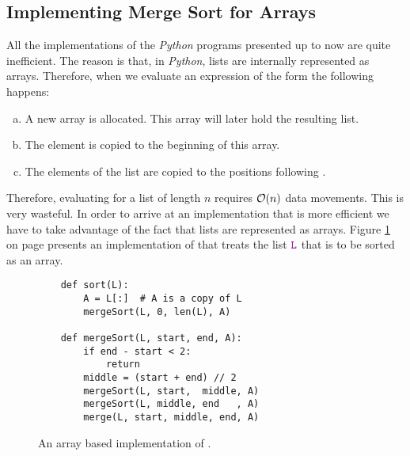 \subsection{Implementing Merge Sort for Arrays}
All the implementations of the \textsl{Python} programs presented up to now are quite inefficient.  The
reason is that, in \textsl{Python}, lists are internally represented as arrays.  Therefore, when
we evaluate an expression of the form
the following happens:
\begin{enumerate}[(a)]
\item A new array is allocated.  This array will later hold the resulting list.
\item The element  is copied to the beginning of this array.
\item The elements of the list  are copied to the positions following .
\end{enumerate}
Therefore, evaluating  for a list  of length $n$ requires $\mathcal{O}(n)$ data
movements.  This is very wasteful.  In order to arrive at an
implementation that is more efficient we have to take advantage of the fact that lists are represented as arrays.
Figure \ref{fig:merge-sort-array.stlx} on page \pageref{fig:merge-sort-array.stlx} presents
an implementation of  that treats the list $\mytt{L}$ that is to be sorted as an array.


\begin{figure}[!ht]
  \centering
\begin{verbatim}
    def sort(L):
        A = L[:]  # A is a copy of L
        mergeSort(L, 0, len(L), A)
    
    def mergeSort(L, start, end, A):
        if end - start < 2:
            return
        middle = (start + end) // 2
        mergeSort(L, start,  middle, A)
        mergeSort(L, middle, end   , A)
        merge(L, start, middle, end, A)
\end{verbatim}
\vspace*{-0.3cm}
  \caption{An array based implementation of .}
  \label{fig:merge-sort-array.stlx}
\end{figure}

